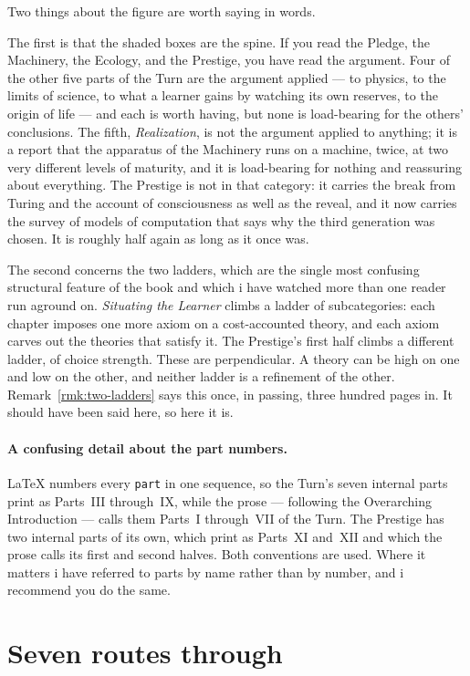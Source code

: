 Two things about the figure are worth saying in words.

The first is that the shaded boxes are the spine.
If you read the Pledge, the Machinery, the Ecology, and the
Prestige, you have read the argument.
Four of the other five parts of the Turn are the argument applied
--- to physics, to the limits of science, to what a learner gains by
watching its own reserves, to the origin of life --- and each is worth
having, but none is load-bearing for the others' conclusions.
The fifth, \emph{Realization}, is not the argument applied to anything;
it is a report that the apparatus of the Machinery runs on a machine,
twice, at two very different levels of maturity, and it is load-bearing
for nothing and reassuring about everything.
The Prestige is not in that category: it carries the break from Turing
and the account of consciousness as well as the reveal, and it now
carries the survey of models of computation that says why the third
generation was chosen.
It is roughly half again as long as it once was.

The second concerns the two ladders, which are the single most
confusing structural feature of the book and which i have watched
more than one reader run aground on.
\emph{Situating the Learner} climbs a ladder of subcategories: each
chapter imposes one more axiom on a cost-accounted theory, and each
axiom carves out the theories that satisfy it.
The Prestige's first half climbs a different ladder, of choice
strength.
These are perpendicular.
A theory can be high on one and low on the other, and neither
ladder is a refinement of the other.
Remark~\ref{rmk:two-ladders} says this once, in passing, three
hundred pages in.
It should have been said here, so here it is.

\paragraph{A confusing detail about the part numbers.}
\LaTeX{} numbers every \texttt{part} in one sequence, so the Turn's
seven internal parts print as Parts~III through~IX, while the prose
--- following the Overarching Introduction --- calls them Parts~I
through~VII of the Turn.
The Prestige has two internal parts of its own, which print as
Parts~XI and~XII and which the prose calls its first and second halves.
Both conventions are used.
Where it matters i have referred to parts by name rather than by
number, and i recommend you do the same.

\section*{Seven routes through}

